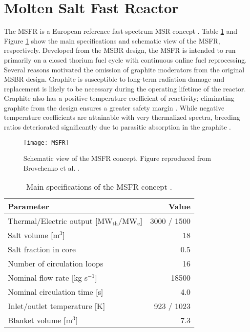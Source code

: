 \section{Molten Salt Fast Reactor}

The \gls{MSFR} is a European reference fast-spectrum \gls{MSR} concept
\cite{mathieu_thorium_2006, merle_optimized_2007}. Table \ref{table:msfr} and
Figure \ref{fig:msfr} show the main specifications and schematic view of the
\gls{MSFR}, respectively. Developed from the \gls{MSBR} design, the
\gls{MSFR} is intended to run primarily on a closed thorium fuel cycle with
continuous online fuel reprocessing. Several reasons motivated the omission of
graphite moderators from the original \gls{MSBR} design. Graphite is
susceptible to
long-term radiation damage and replacement is likely to be necessary during
the operating lifetime of the reactor. Graphite also has a positive
temperature coefficient of reactivity; eliminating graphite from the design
ensures a greater safety margin \cite{mathieu_thorium_2006}. While negative
temperature coefficients are attainable with very thermalized spectra,
breeding ratios deteriorated significantly due to parasitic absorption in the
graphite \cite{mathieu_thorium_2006}.
%
\begin{figure}[htb!] 
	\centering
	\texttt{[image: MSFR]}
	\caption{Schematic view of the MSFR concept. Figure reproduced from
	Brovchenko et al. \cite{brovchenko_design-related_2013}.}
	\label{fig:msfr}
\end{figure}
%
\begin{table}[htb!]
    \small
	\caption{Main specifications of the \gls{MSFR} concept
				\cite{serp_molten_2014}.}
	\centering
	\begin{tabular}{ l r }
		\toprule
		Parameter & Value \\
		\midrule
		Thermal/Electric output [MW$_{\text{th}}$/MW$_{\text{e}}$] & 3000 /
		1500 
		\\
		Salt volume [m$^3$] & 18 \\
		Salt fraction in core & 0.5 \\
		Number of circulation loops & 16 \\
		Nominal flow rate [kg s$^{-1}$] & 18500  \\
		Nominal circulation time [s] & 4.0 \\
		Inlet/outlet temperature [K] & 923 / 1023 \\
		Blanket volume [m$^3$] & 7.3\\
		\bottomrule
	\end{tabular}
	\label{table:msfr}
\end{table}

